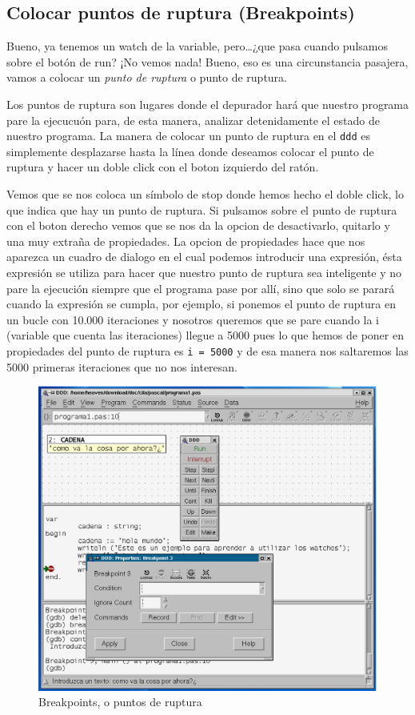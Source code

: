 \subsection{Colocar puntos de  ruptura (Breakpoints)}

Bueno, ya tenemos un watch de la variable, pero\ldots ¿que pasa cuando
pulsamos sobre el botón de run? ¡No vemos nada! Bueno, eso es una
circunstancia pasajera, vamos a colocar un {\em punto de ruptura} o
punto de ruptura.

Los puntos de ruptura son lugares donde el depurador hará que nuestro
programa pare la ejecucuón para, de esta manera, analizar detenidamente
el estado de nuestro programa. La manera de colocar un punto de ruptura
en el {\tt ddd} es simplemente desplazarse hasta la línea donde deseamos
colocar el punto de ruptura y hacer un doble click con el boton
izquierdo del ratón.

Vemos que se nos coloca un símbolo de stop donde hemos hecho el doble
click, lo que indica que hay un punto de ruptura. Si pulsamos sobre el
punto de ruptura con el boton derecho vemos que se nos da la opcion
de desactivarlo, quitarlo y una muy extraña de propiedades. La opcion
de propiedades hace que nos aparezca un cuadro de dialogo en el cual
podemos introducir una expresión, ésta expresión se utiliza para hacer
que nuestro punto de ruptura sea inteligente y no pare la ejecución
siempre que el programa pase por allí, sino que solo se parará cuando
la expresión se cumpla, por ejemplo, si ponemos el punto de ruptura en
un bucle con 10.000 iteraciones y nosotros queremos que se pare cuando
la i (variable que cuenta las iteraciones) llegue a 5000 pues lo que
hemos de poner en propiedades del punto de ruptura es {\tt i = 5000} y
de esa manera nos saltaremos las 5000 primeras iteraciones que no nos
interesan.

\begin{figure}[hbtp]
\centering
\includegraphics[width=\textwidth]{imagenes/ddd_breakpoint.eps}
\caption{Breakpoints, o puntos de ruptura}
\end{figure}

